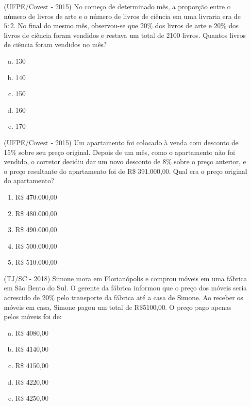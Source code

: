  \begin{exer}
 (UFPE/Covest - 2015) No começo de determinado mês, a proporção entre o número de livros de arte e o número de livros de ciência em uma livraria era de $5:2$. No final do mesmo mês, observou-se que $20\%$ dos livros de arte e $20\%$ dos livros de ciência foram vendidos e restava um total de 2100 livros. Quantos livros de ciência foram vendidos no mês?
 \begin{enumerate}[a)]
 \item 130
 \item 140
 \item 150
 \item 160
 \item 170
 \end{enumerate}
 \end{exer} 
 
 \begin{exer}
 (UFPE/Covest - 2015) Um apartamento foi colocado à venda com desconto de 15\% sobre seu preço original. Depois de um mês, como o apartamento não foi vendido, o corretor decidiu dar um novo desconto de 8\% sobre o preço anterior, e o preço resultante do apartamento foi de R\$ 391.000,00. Qual era o preço original do apartamento?
 \begin{enumerate}
 \item R\$ 470.000,00
 \item R\$ 480.000,00
 \item R\$ 490.000,00
 \item R\$ 500.000,00
 \item R\$ 510.000,00
 \end{enumerate}
 \end{exer} 
 
 \begin{exer}
 (TJ/SC - 2018) Simone mora em Florianópolis e comprou móveis em uma fábrica em São Bento do Sul. O gerente da fábrica informou que o preço dos móveis seria acrescido de 20\% pelo transporte da fábrica até a casa de Simone.
  Ao receber os móveis em casa, Simone pagou um total de R\$5100,00. O preço pago apenas pelos móveis foi de:
  \begin{enumerate}[a)]
  \item R\$ 4080,00
  \item R\$ 4140,00
  \item R\$ 4150,00
  \item R\$ 4220,00
  \item R\$ 4250,00
 \end{enumerate}
 \end{exer} 
 
